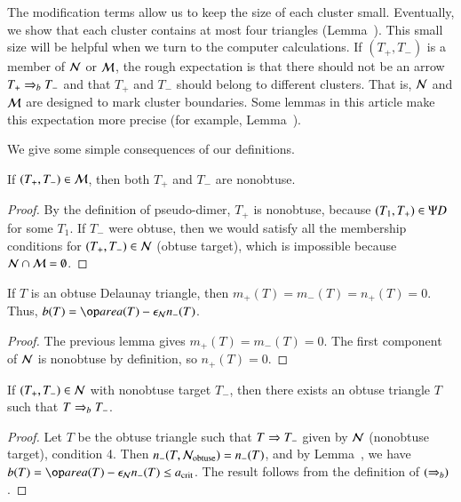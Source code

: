 The modification terms allow us to keep the size of each cluster small.
Eventually, we show that each cluster contains at most four triangles
(Lemma~).  This small size will be helpful when we
turn to the computer calculations.  If $(T_+,T_-)$ is a member of $\mathcal N$
or $\mathcal M$, the rough expectation is that there should not be an arrow
$T_+\Rightarrow_{b} T_-$ and that $T_+$ and $T_-$ should belong to different
clusters.  That is, $\mathcal N$ and $\mathcal M$ are designed to mark cluster
boundaries.  Some lemmas in this article make this expectation more
precise (for example, Lemma~).

We give some simple consequences of our definitions.

\begin{lemma}\label{lemma:M-nonobtuse}
  If $(T_+,T_-)\in \mathcal M$, then both $T_+$ and $T_-$ are nonobtuse.
\end{lemma}

\begin{proof} 
  By the definition of pseudo-dimer, $T_+$ is nonobtuse, because
  $(T_1,T_+)\in\Psi D$ for some $T_1$.  If $T_-$ were obtuse, then we
  would satisfy all the membership conditions for $(T_+,T_-)\in \mathcal N$
  (obtuse target), which is impossible because $\mathcal N\cap \mathcal M =
  \emptyset$.
\end{proof}

\begin{lemma}[obtuse $b$] 
  If $T$ is an obtuse Delaunay triangle, then
  $m_+(T)=m_-(T)=n_+(T)=0$.  Thus, $b(T) = \area(T) - \epsN n_-(T)$.
\end{lemma}

\begin{proof} 
  The previous lemma gives $m_+(T)=m_-(T)=0$.  The first component of
  $\mathcal N$ is nonobtuse by definition, so $n_+(T)=0$.
\end{proof}

\begin{corollary} 
  If $(T_+,T_-)\in\mathcal N$ with nonobtuse target $T_-$, then there exists
  an obtuse triangle $T$ such that $T\Rightarrow_{b} T_-$.
\end{corollary}

\begin{proof} 
  Let $T$ be the obtuse triangle such that $T\Rightarrow T_-$ given by $\mathcal N$
  (nonobtuse target), condition 4.  Then $n_-(T,\mathcal N_{\text{obtuse}}) =
  n_-(T)$, and by Lemma~, we have $b(T) =
  \area(T)-\epsN n_-(T)\le\acrit$.  The result follows from the
  definition of $(\Rightarrow_{b})$.
\end{proof}



